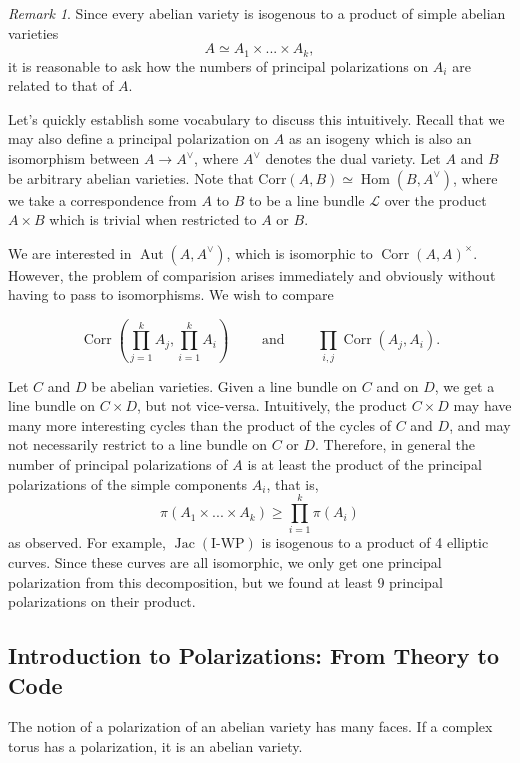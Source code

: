 \documentclass[12pt,reqno]{amsart}
\DeclareMathOperator{\Aut}{Aut}
\DeclareMathOperator{\Hom}{Hom}
\DeclareMathOperator{\Jac}{Jac}
\DeclareMathOperator{\Corr}{Corr}
\theoremstyle{definition}
\theoremstyle{remark}
\newtheorem*{remark}{Remark}
\begin{document}
\begin{remark} Since every abelian variety is isogenous to a product of simple abelian varieties $$A \simeq A_1 \times ... \times A_k,$$ it is reasonable to ask how the numbers of principal polarizations on $A_i$ are related to that of $A$. 

Let's quickly establish some vocabulary to discuss this intuitively. Recall that we may also define a principal polarization on $A$ as an isogeny which is also an isomorphism between $A \to A^\vee$, where $A^\vee$ denotes the dual variety. Let $A$ and $B$ be arbitrary abelian varieties. Note that $\text{Corr}(A, B) \simeq \Hom(B, A^\vee)$, where we take a correspondence from $A$ to $B$ to be a line bundle $\mathcal{L}$ over the product $A \times B$ which is trivial when restricted to $A$ or $B$.

We are interested in $\Aut(A, A^\vee)$, which is isomorphic to $\Corr(A, A)^\times$. However, the problem of comparision arises immediately and obviously without having to pass to isomorphisms. We wish to compare

$$\Corr\left(\prod_{j= 1}^k A_j, \prod_{i= 1}^k A_i\right) \qquad \text{ and  } \qquad \prod_{i, j} \Corr(A_j, A_i).$$

Let $C$ and $D$ be abelian varieties. Given a line bundle on $C$ and on $D$, we get a line bundle on $C \times D$, but not vice-versa. Intuitively, the product $C \times D$ may have many more interesting cycles than the product of the cycles of $C$ and $D$, and may not necessarily restrict to a line bundle on $C$ or $D$. Therefore, in general the number of principal polarizations of $A$ is at least the product of the principal polarizations of the simple components $A_i$, that is, $$\pi(A_1 \times ... \times A_k) \geq \prod_{i=1}^k \pi(A_i)$$ as observed. For example, $\Jac(\text{I-WP})$ is isogenous to a product of 4 elliptic curves. Since these curves are all isomorphic, we only get one principal polarization from this decomposition, but we found at least 9 principal polarizations on their product.
\end{remark}  



\subsection{Introduction to Polarizations: From Theory to Code}
\label{sec:intropol}
The notion of a polarization of an abelian variety has many faces. If a complex torus has a polarization, it is an abelian variety.
\end{document}
